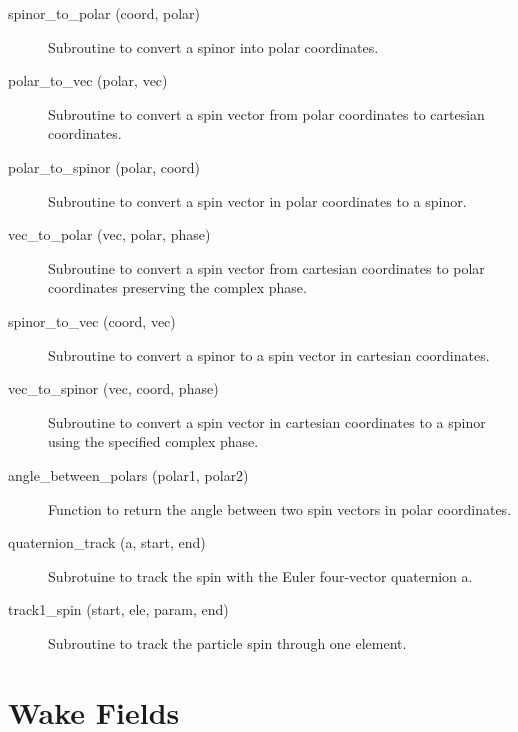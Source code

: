 \begin{description}

\item[spinor\_to\_polar (coord, polar)] \Newline 
Subroutine to convert a spinor into polar coordinates.

\item[polar\_to\_vec (polar, vec)] \Newline
Subroutine to convert a spin vector from polar coordinates to cartesian coordinates.

\item[polar\_to\_spinor (polar, coord)] \Newline
Subroutine to convert a spin vector in polar coordinates to a spinor.

\item[vec\_to\_polar (vec, polar, phase)] \Newline
Subroutine to convert a spin vector from cartesian coordinates to polar coordinates 
preserving the complex phase.

\item[spinor\_to\_vec (coord, vec)] \Newline
Subroutine to convert a spinor to a spin vector in cartesian coordinates.

\item[vec\_to\_spinor (vec, coord, phase)] \Newline
Subroutine to convert a spin vector in cartesian coordinates to a spinor using
the specified complex phase.

\item[angle\_between\_polars (polar1, polar2)] \Newline
Function to return the angle between two spin vectors in polar coordinates.

\item[quaternion\_track (a, start, end)] \Newline
Subrotuine to track the spin with the Euler four-vector quaternion a.

\item[track1\_spin (start, ele, param, end)] \Newline
Subroutine to track the particle spin through one element.

\end{description}

\section{Wake Fields}
\label{r:wake}    

